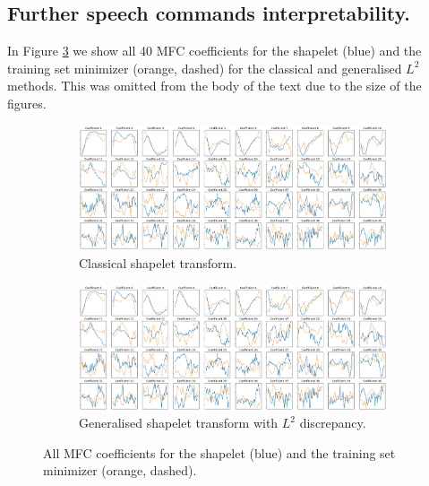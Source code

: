 \documentclass{article}
\theoremstyle{plain}
\theoremstyle{definition}
\begin{document}
    \subsection{Further speech commands interpretability.} \label{apx:further_speech_commands_interpretability}
	In Figure \ref{fig:speech_commands_axisplot} we show all 40 MFC coefficients for the shapelet (blue) and the training set minimizer (orange, dashed) for the classical and generalised $L^2$ methods. This was omitted from the body of the text due to the size of the figures.
	\begin{figure}[t]
		\begin{subfigure}[b]{\linewidth}
			\centering
			\includegraphics[width=\linewidth]{images/new_speech_commands_axisplots.png}
			\caption{Classical shapelet transform.}
			\label{fig:old_speech_commands_axisplot}
		\end{subfigure}
		\begin{subfigure}[b]{\linewidth}
			\centering
			\includegraphics[width=\linewidth]{images/new_speech_commands_axisplots.png}
			\caption{Generalised shapelet transform with $L^2$ discrepancy.}
			\label{fig:new_speech_commands_axisplot}
		\end{subfigure}
		\caption{All MFC coefficients for the shapelet (blue) and the training set minimizer (orange, dashed).}
		\label{fig:speech_commands_axisplot}
	\end{figure}
\end{document}
